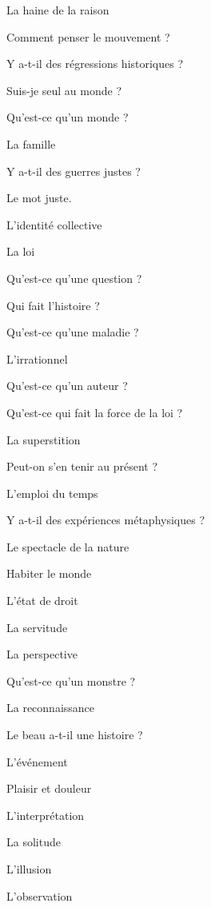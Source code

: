 \documentclass[a4paper,12pt]{report}
\begin{document}
\begin{multicols}{2}
\noindent La haine de la raison \par
\noindent Comment penser le mouvement ? \par
\noindent Y a-t-il des régressions historiques ? \par
\noindent Suis-je seul au monde ? \par
\noindent Qu'est-ce qu'un monde ? \par
\noindent La famille \par
\noindent Y a-t-il des guerres justes ? \par
\noindent Le mot juste. \par
\noindent L'identité collective \par
\noindent La loi \par
\noindent Qu'est-ce qu'une question ? \par
\noindent Qui fait l'histoire ? \par
\noindent Qu'est-ce qu'une maladie ? \par
\noindent L'irrationnel \par
\noindent Qu'est-ce qu'un auteur ? \par
\noindent Qu'est-ce qui fait la force de la loi ? \par
\noindent La superstition \par
\noindent Peut-on s'en tenir au présent ? \par
\noindent L'emploi du temps \par
\noindent Y a-t-il des expériences métaphysiques ? \par
\noindent Le spectacle de la nature \par
\noindent Habiter le monde \par
\noindent L'état de droit \par
\noindent La servitude \par
\noindent La perspective \par
\noindent Qu'est-ce qu'un monstre ? \par
\noindent La reconnaissance \par
\noindent Le beau a-t-il une histoire ? \par
\noindent L'événement \par
\noindent Plaisir et douleur \par
\noindent L'interprétation \par
\noindent La solitude \par
\noindent L'illusion \par
\noindent L'observation \par

\end{multicols}
\end{document}
